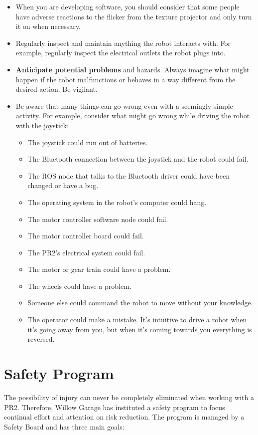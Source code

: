 \begin{itemize}
\item When you are developing software, you should consider that some people have adverse reactions to the flicker from the texture projector and only turn it on when necessary.
\item Regularly inspect and maintain anything the robot interacts with.  For example, regularly inspect the electrical outlets the robot plugs into.
\item {\bf Anticipate potential problems} and hazards.  Always imagine what might happen if the robot malfunctions or behaves in a way different from the desired action.  Be vigilant.
\item Be aware that many things can go wrong even with a seemingly simple activity. For example, consider what might go wrong while driving the robot with the joystick:
\begin{itemize}
\item The joystick could run out of batteries.
\item The Bluetooth connection between the joystick and the robot could fail.
\item The ROS node that talks to the Bluetooth driver could have been changed or have a bug.
\item The operating system in the robot's computer could hang.
\item The motor controller software node could fail.
\item The motor controller board could fail.
\item The PR2's electrical system could fail.
\item The motor or gear train could have a problem.
\item The wheels could have a problem.
\item Someone else could command the robot to move without your knowledge.
\item The operator could make a mistake. It's intuitive to drive a robot when it's going away from you, but when it's coming towards you everything is reversed.
\end{itemize}
\end{itemize}

\section{Safety Program}

The possibility of injury can never be completely eliminated when working with a PR2. Therefore, Willow Garage has instituted a safety program to focus continual effort and attention on risk reduction. The program is managed by a Safety Board and has three main goals:

